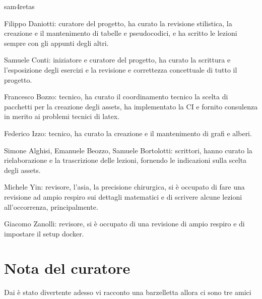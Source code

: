 \documentclass[class=book, crop=false, oneside, 12pt]{standalone}
\begin{document}
\begin{labeling}{sam4retas}
    \item[p!ps] Filippo Daniotti: curatore del progetto, ha curato la revisione stilistica, la creazione e il mantenimento di tabelle e pseudocodici, e ha scritto le lezioni sempre con gli appunti degli altri.
    \item[sam4retas] Samuele Conti: iniziatore e curatore del progetto, ha curato la scrittura e l'esposizione degli esercizi e la revisione e correttezza concettuale di tutto il progetto.
    \item[frab0zzo] Francesco Bozzo: tecnico, ha curato il coordinamento tecnico la scelta di pacchetti per la creazione degli assets, ha implementato la CI e fornito consulenza in merito ai problemi tecnici di latex.
    \item[f1zzo] Federico Izzo: tecnico, ha curato la creazione e il mantenimento di grafi e alberi.
    \item[t0k3n\$] Simone Alghisi, Emanuele Beozzo, Samuele Bortolotti: scrittori, hanno curato la rielaborazione e la trascrizione delle lezioni, fornendo le indicazioni sulla scelta degli assets.
    \item[ch!n4] Michele Yin: revisore, l'asia, la precisione chirurgica, si è occupato di fare una revisione ad ampio respiro sui dettagli matematici e di scrivere alcune lezioni all'occorrenza, principalmente.
    \item[j4bb] Giacomo Zanolli: revisore, si è occupato di una revisione di ampio respiro e di impostare il setup docker. 
\end{labeling}  

\section*{Nota del curatore}
Dai è stato divertente adesso vi racconto una barzelletta allora ci sono tre amici
\end{document}
